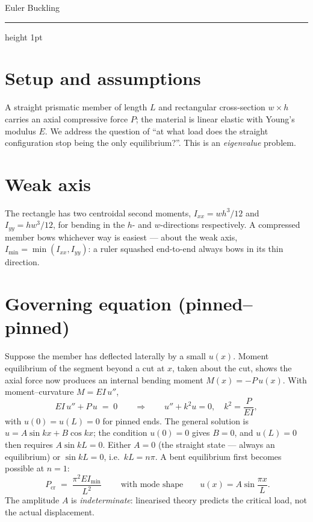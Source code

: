 \documentclass[10pt,a4paper]{article}
\begin{document}
{\LARGE Euler Buckling}


\medskip
{\color{celline}\hrule height 1pt}

\section*{Setup and assumptions}
A straight prismatic member of length $L$ and rectangular cross-section
$w \times h$ carries an axial compressive force $P$; the material is linear
elastic with Young's modulus $E$. We address the question of ``at what load does the straight configuration stop being the only equilibrium?''. This is an \emph{eigenvalue} problem.

\section*{Weak axis}
The rectangle has two centroidal second moments,
$I_{xx} = w h^3/12$ and $I_{yy} = h w^3/12$, for bending in the $h$- and
$w$-directions respectively. A compressed member bows whichever way is easiest
--- about the weak axis,
$I_{\min} = \min(I_{xx}, I_{yy})$: a ruler squashed end-to-end always bows in
its thin direction.

\section*{Governing equation (pinned--pinned)}
Suppose the member has deflected laterally by a small $u(x)$. Moment equilibrium
of the segment beyond a cut at $x$, taken about the cut, shows the axial force now
produces an internal bending moment $M(x) = -P\,u(x)$. With moment--curvature
$M = EI\,u''$,
\begin{equation}
EI\,u'' + P\,u \;=\; 0
\qquad\Longrightarrow\qquad
u'' + k^2 u = 0, \quad k^2 = \frac{P}{EI},
\end{equation}
with $u(0) = u(L) = 0$ for pinned ends. The general solution is
$u = A\sin kx + B\cos kx$; the condition $u(0)=0$ gives $B = 0$, and $u(L)=0$
then requires $A \sin kL = 0$. Either $A = 0$ (the straight state --- always an
equilibrium) or $\sin kL = 0$, i.e.\ $kL = n\pi$. A bent equilibrium first
becomes possible at $n = 1$:
\begin{equation}
\boxed{\; P_{\mathrm{cr}} \;=\; \frac{\pi^2 E I_{\min}}{L^2} \;}
\qquad\text{with mode shape}\qquad
u(x) = A \sin\!\frac{\pi x}{L}.
\end{equation}
The amplitude $A$ is \emph{indeterminate}: linearised theory predicts the
critical load, not the actual displacement.
\end{document}
